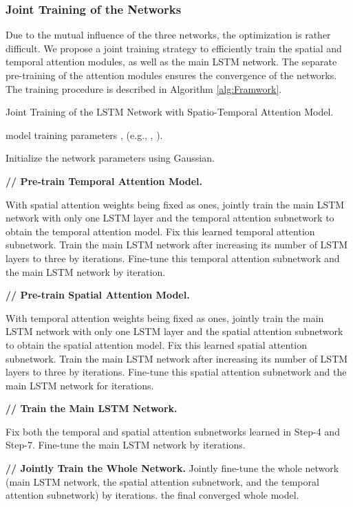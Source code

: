 \documentclass[letterpaper]{article}
\begin{document}
\subsubsection{Joint Training of the Networks} Due to the mutual influence of the three networks, the optimization is rather difficult. We propose a joint training strategy to efficiently train the spatial and temporal attention modules, as well as the main LSTM network. The separate pre-training of the attention modules ensures the convergence of the networks. The training procedure is described in Algorithm \ref{alg:Framwork}.
\vspace{-3mm}
\begin{algorithm}[htb]


	\caption{Joint Training of the LSTM Network with Spatio-Temporal Attention Model.}
	\label{alg:Framwork}
	\begin{algorithmic}[1]
	    \REQUIRE model training parameters ,  (e.g., , ).


	    \STATE Initialize the network parameters using Gaussian. 

	    \textbf{// Pre-train Temporal Attention Model.}
	     	
		\STATE With spatial attention weights being fixed as ones, jointly train the main LSTM network with only one LSTM layer and the temporal attention subnetwork to obtain the temporal attention model.
		\STATE Fix this learned temporal attention subnetwork. Train the main LSTM network after increasing its number of LSTM layers to three by  iterations.
		\STATE Fine-tune this temporal attention subnetwork and the main LSTM network by  iteration.
		
		\textbf{// Pre-train Spatial Attention Model.}
		
		\STATE With temporal attention weights being fixed as ones, jointly train the main LSTM network with only one LSTM layer and the spatial attention subnetwork to obtain the spatial attention model.
		\STATE Fix this learned spatial attention subnetwork. Train the main LSTM network after increasing its number of LSTM layers to three by  iterations.
		\STATE Fine-tune this spatial attention subnetwork and the main LSTM network for  iterations.
		
		\textbf{// Train the Main LSTM Network.}
		
		\STATE Fix both the temporal and spatial attention subnetworks learned in Step-4 and Step-7. Fine-tune the main LSTM network by  iterations.
		
		\textbf{// Jointly Train the Whole Network.}
		\STATE Jointly fine-tune the whole network (main LSTM network, the spatial attention subnetwork, and the temporal attention subnetwork) by  iterations.
		\ENSURE  the final converged whole model.
	\end{algorithmic}
\end{algorithm}
\vspace{-3mm}
\end{document}

